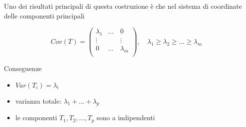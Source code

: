 \documentclass[
  11pt,
]{book}
\providecommand{\tightlist}{%
  \setlength{\itemsep}{0pt}\setlength{\parskip}{0pt}}
\begin{document}
Uno dei risultati principali di questa costruzione è che nel sistema di coordinate delle componenti principali

\begin{equation}\label{eq:Corr}
Cov(T)=\left(
\begin{array}{cccc}
\lambda_1  & \dots & 0 \\
\vdots & \quad & \vdots \\
0 & \dots & \lambda_m \\
\end{array}
\right),
\quad \lambda_1 \geq \lambda_2 \geq \dots \geq \lambda_m
\end{equation}

Conseguenze

\begin{itemize}
\tightlist
\item
  \(Var(T_i)=\lambda_i\)\\
\item
  varianza totale: \(\lambda_1+\dots+\lambda_p\)\\
\item
  le componenti \(T_1,T_2,\dots,T_p\) sono a indipendenti
\end{itemize}

  

\end{document}
